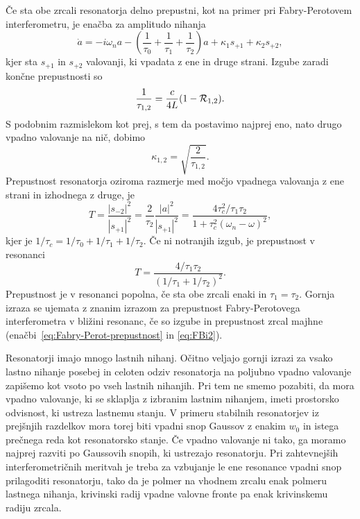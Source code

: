 Če sta obe zrcali resonatorja delno prepustni, kot na primer pri 
Fabry-Perotovem interferometru, je enačba za amplitudo nihanja 
\begin{equation}
\dot{a}=-i\omega_{n}a-\left(\frac{1}{\tau_{0}}+\frac{1}{\tau_{1}}+\frac{1}{\tau_{2}}\right)
a+\kappa_{1}s_{+1}+\kappa_{2}s_{+2},
\label{3.49}
\end{equation}
 kjer sta $s_{+1}$ in $s_{+2}$ valovanji, ki vpadata z ene in druge strani.
Izgube zaradi končne prepustnosti so
\begin{equation}
\frac{1}{\tau_{1,2}}=\frac{c}{4L}(1-{\cal R}_{1,2}).\label{3.50}
\end{equation}
S podobnim razmislekom kot prej, s tem da postavimo najprej eno, nato drugo
vpadno valovanje na nič, dobimo 
\begin{equation}
\kappa_{1,2}=\sqrt{\frac{2}{\tau_{1,2}}}.
\label{3.51}
\end{equation}
Prepustnost resonatorja oziroma razmerje med močjo vpadnega valovanja
z ene strani in izhodnega z druge, je
\begin{equation}
T=\frac{|s_{-2}|^{2}}{|s_{+1}|^{2}}=\frac{2}{\tau_{2}}\frac{|a|^{2}}{|s_{+1}|^{2}}=\frac{4\tau_c^{2}/
\tau_{1}\tau_{2}}{1+\tau_c^{2}(\omega_{n}-\omega)^{2}},
\label{3.52}
\end{equation}
 kjer je $1/\tau_c=1/\tau_{0}+1/\tau_{1}+1/\tau_{2}$. 
 Če ni notranjih izgub, je prepustnost v resonanci 
\begin{equation}
T=\frac{4/\tau_{1}\tau_{2}}{(1/\tau_{1}+1/\tau_{2})^{2}}.
\label{3.53}
\end{equation}
Prepustnost je v resonanci popolna, če sta obe zrcali enaki in $\tau_{1}=\tau_{2}$.
Gornja izraza se ujemata z znanim izrazom 
za prepustnost Fabry-Perotovega interferometra v bližini resonanc,
če so izgube in prepustnost zrcal majhne (enačbi~\ref{eq:Fabry-Perot-prepustnost} 
in \ref{eq:FBi2}). 

Resonatorji imajo mnogo lastnih nihanj. Očitno veljajo gornji izrazi
za vsako lastno nihanje posebej in celoten odziv resonatorja na poljubno vpadno
valovanje zapišemo kot vsoto po vseh lastnih nihanjih. Pri tem ne smemo pozabiti,
da mora vpadno valovanje, ki se sklaplja z izbranim lastnim nihanjem,
imeti prostorsko odvisnost, ki ustreza lastnemu stanju. V primeru
stabilnih resonatorjev iz prejšnjih razdelkov mora torej biti vpadni
snop Gaussov z enakim $w_{0}$ in istega prečnega reda kot resonatorsko
stanje. Če vpadno valovanje ni tako, ga moramo najprej razviti po
Gaussovih snopih, ki ustrezajo resonatorju.
Pri zahtevnejših interferometričnih meritvah je treba za vzbujanje le ene 
resonance vpadni snop prilagoditi resonatorju, tako da je polmer na vhodnem 
zrcalu enak polmeru lastnega nihanja, krivinski radij vpadne valovne fronte 
pa enak krivinskemu radiju zrcala. 

